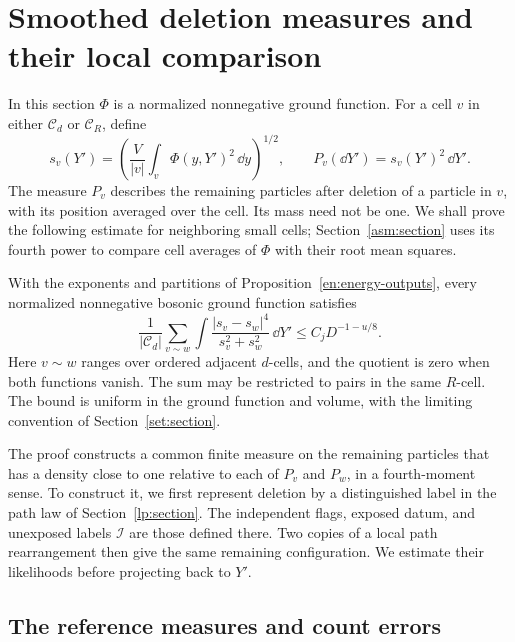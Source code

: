 \section{Smoothed deletion measures and their local comparison}
\label{palm:section}\label{sec:local-palm}

In this section $\Phi$ is a normalized nonnegative ground function.
For a cell $v$ in either $\mathcal C_d$ or $\mathcal C_R$, define
\begin{equation}\label{palm:rms-density}
 s_v(Y')=\left(\frac V{|v|}\int_v\Phi(y,Y')^2\,\dd y\right)^{1/2},
 \qquad P_v(\dd Y')=s_v(Y')^2\,\dd Y'.
\end{equation}
The measure $P_v$ describes the remaining particles after deletion of
a particle in $v$, with its position averaged over the cell.  Its mass
need not be one.  We shall prove the following estimate for neighboring
small cells; Section~\ref{asm:section} uses its fourth power to compare
cell averages of $\Phi$ with their root mean squares.

\begin{proposition}
\label{palm:local-comparison}
With the exponents and partitions of Proposition~\ref{en:energy-outputs},
every normalized nonnegative bosonic ground function satisfies
\begin{equation}\label{palm:local-rms-comparison}
 \frac1{|\mathcal C_d|}\sum_{v\sim w}
       \int\frac{|s_v-s_w|^4}{s_v^2+s_w^2}\,\dd Y'
                 \le C_jD^{-1-u/8}.
\end{equation}
Here $v\sim w$ ranges over ordered adjacent $d$-cells, and the
quotient is zero when both functions vanish.  The sum may be restricted
to pairs in the same $R$-cell.  The bound is uniform in the ground
function and volume, with the limiting convention of
Section~\ref{set:section}.
\end{proposition}

The proof constructs a common finite measure on the remaining particles
that has a density close to one relative to each of $P_v$ and $P_w$,
in a fourth-moment sense.  To construct it, we first represent deletion
by a distinguished label in the path law of Section~\ref{lp:section}.
The independent flags, exposed datum, and unexposed labels $\mathcal I$
are those defined there.  Two copies of a local path rearrangement
then give the same remaining configuration.  We estimate their
likelihoods before projecting back to $Y'$.

\subsection{The reference measures and count errors}

